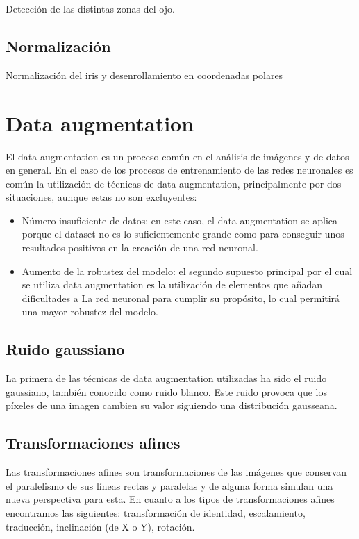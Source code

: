 Detección de las distintas zonas del ojo.

\subsection{Normalización}

Normalización del iris y desenrollamiento en coordenadas polares


\section{Data augmentation}

El data augmentation es un proceso común en el análisis de imágenes y de datos en general. En el caso de los procesos de entrenamiento de las redes neuronales es común
la utilización de técnicas de data augmentation, principalmente por dos situaciones, aunque estas no son excluyentes:

\begin{itemize}
	\item Número insuficiente de datos: en este caso, el data augmentation se aplica porque el dataset no es lo suficientemente grande como para conseguir unos resultados 
positivos en la creación de una red neuronal.
	\item Aumento de la robustez del modelo: el segundo supuesto principal por el cual se utiliza data augmentation es la utilización de elementos que añadan dificultades a La
red neuronal para cumplir su propósito, lo cual permitirá una mayor robustez del modelo.
\end{itemize}

\subsection{Ruido gaussiano}

La primera de las técnicas de data augmentation utilizadas ha sido el ruido gaussiano, también conocido como ruido blanco. Este ruido provoca que los píxeles de una imagen cambien
su valor siguiendo una distribución gausseana.

\subsection{Transformaciones afines}

Las transformaciones afines son transformaciones de las imágenes que conservan el paralelismo de sus líneas rectas y paralelas y de alguna forma simulan una nueva perspectiva para esta.
En cuanto a los tipos de transformaciones afines encontramos las siguientes: transformación de identidad, escalamiento, traducción, inclinación (de X o Y), rotación.

